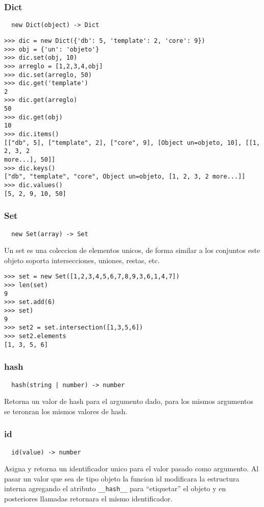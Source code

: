 \subsubsection*{Dict}
\begin{verbatim}
  new Dict(object) -> Dict
\end{verbatim}
\begin{lstlisting}[style=consola]
>>> dic = new Dict({'db': 5, 'template': 2, 'core': 9})
>>> obj = {'un': 'objeto'}
>>> dic.set(obj, 10)
>>> arreglo = [1,2,3,4,obj]
>>> dic.set(arreglo, 50)
>>> dic.get('template')
2
>>> dic.get(arreglo)
50
>>> dic.get(obj)
10
>>> dic.items()
[["db", 5], ["template", 2], ["core", 9], [Object un=objeto, 10], [[1, 2, 3, 2
more...], 50]]
>>> dic.keys()
["db", "template", "core", Object un=objeto, [1, 2, 3, 2 more...]]
>>> dic.values()
[5, 2, 9, 10, 50]
\end{lstlisting}

\subsubsection*{Set}
\begin{verbatim}
  new Set(array) -> Set
\end{verbatim}
Un set es una coleccion de elementos unicos, de forma similar a los conjuntos
este objeto soporta intersecciones, uniones, restas, etc.
\begin{lstlisting}[style=consola]
>>> set = new Set([1,2,3,4,5,6,7,8,9,3,6,1,4,7])
>>> len(set)
9
>>> set.add(6)
>>> set)
9
>>> set2 = set.intersection([1,3,5,6])
>>> set2.elements
[1, 3, 5, 6]
\end{lstlisting}

\subsubsection*{hash}
\begin{verbatim}
  hash(string | number) -> number
\end{verbatim}
Retorna un valor de hash para el argumento dado, para los mismos argumentos se
teronran los mismos valores de hash.

\subsubsection*{id}
\begin{verbatim}
  id(value) -> number
\end{verbatim}
Asigna y retorna un identificador unico para el valor pasado como argumento.
Al pasar un valor que sea de tipo objeto la funcion id modificara la
estructura interna agregando el atributo \verb|__hash__| para ``etiquetar''
el objeto y en posteriores llamadas retornara el mismo identificador.

